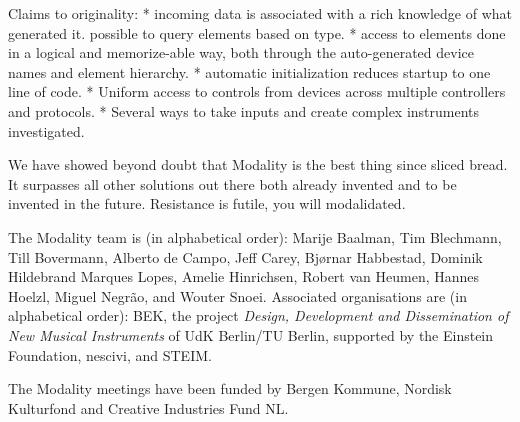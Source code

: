 \documentclass{article}
\begin{document}
Claims to originality:
* incoming data is associated with a rich knowledge of what generated it. possible to query elements based on type.
* access to elements done in a logical and memorize-able way, both through the auto-generated device names and element hierarchy.
* automatic initialization reduces startup to one line of code.
* Uniform access to controls from devices across multiple controllers and protocols.
* Several ways to take inputs and create complex instruments investigated.

We have showed beyond doubt that Modality is the best thing since sliced bread. It surpasses all other solutions out there both already invented and to be invented in the future. Resistance is futile, you will modalidated.


\begin{acknowledgments}
The Modality team is (in alphabetical order):
    Marije Baalman,
    Tim Blechmann,
    Till Bovermann,
    Alberto de Campo,
    Jeff Carey,
    Bj\o{}rnar Habbestad,
    Dominik Hildebrand Marques Lopes,
    Amelie Hinrichsen,
    Robert van Heumen,
    Hannes Hoelzl,
    Miguel Negr\~{a}o, and
    Wouter Snoei.
Associated organisations are (in alphabetical order):
BEK,
the project \emph{Design, Development and Dissemination of New Musical Instruments} of UdK Berlin/TU Berlin, supported by the Einstein Foundation,
nescivi, and
STEIM.

The Modality meetings have been funded by Bergen Kommune, Nordisk Kulturfond and Creative Industries Fund NL.


\end{acknowledgments} 


\end{document}
